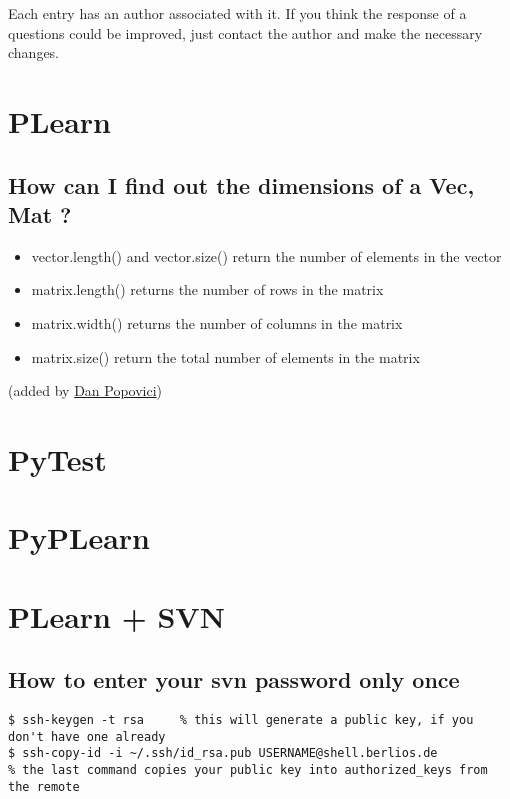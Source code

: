 \documentclass[11pt]{book}
\begin{document}
Each entry has an author associated with it. If you think the response of a questions could be improved, just contact the author and make the necessary changes. 



\chapter{ PLearn }

\section { How can I find out the dimensions of a Vec, Mat ? }
\begin{itemize}
\item vector.length() and vector.size() return the  number of elements in the vector
\item matrix.length() returns the number of rows in the matrix
\item matrix.width() returns the number of columns in the matrix
\item matrix.size() return the total number of elements in the matrix
\end{itemize}
(added by \href{mailto:popovicd@iro.umontreal.ca}{Dan Popovici})

\chapter{ PyTest }

\chapter{ PyPLearn }

\chapter{ PLearn + SVN }

\section { How to enter your svn password only once }

\begin{verbatim}
$ ssh-keygen -t rsa     % this will generate a public key, if you don't have one already
$ ssh-copy-id -i ~/.ssh/id_rsa.pub USERNAME@shell.berlios.de 
% the last command copies your public key into authorized_keys from the remote
\end{verbatim}
\end{document}
